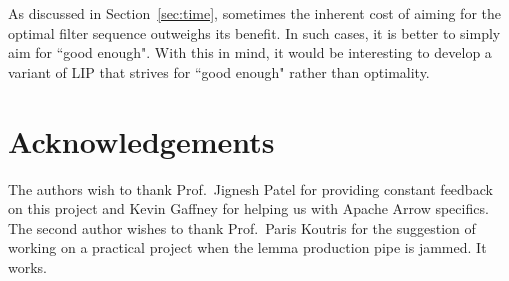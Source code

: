\documentclass[10pt]{article}
\begin{document}
As discussed in Section~\ref{sec:time}, sometimes the inherent cost of aiming for the optimal filter sequence outweighs its benefit.
In such cases, it is better to simply aim for ``good enough". 
With this in mind, it would be interesting to develop a variant of LIP that strives for ``good enough" rather than optimality.





\section*{Acknowledgements}

The authors wish to thank Prof.\ Jignesh Patel for providing constant feedback on this project and Kevin Gaffney for helping us with Apache Arrow specifics. The second author wishes to thank Prof.\ Paris Koutris for the suggestion of working on a practical project when the lemma production pipe is jammed. It works.


{}

\end{document}
